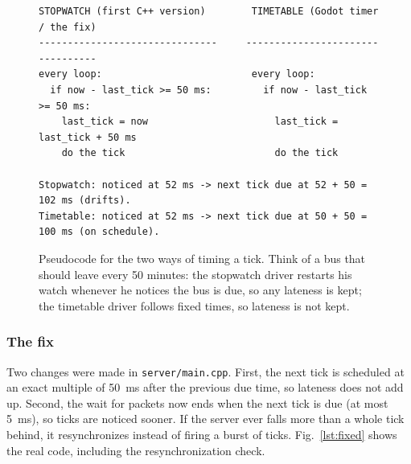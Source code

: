 \IfFileExists{IEEEtran.cls}{\ieeetrue\documentclass[conference]{IEEEtran}}{\ieeefalse\documentclass[twocolumn,10pt]{article}}
\begin{document}
\begin{figure}[!t]
\begin{lstlisting}[language={}]
STOPWATCH (first C++ version)        TIMETABLE (Godot timer / the fix)
-------------------------------     ---------------------------------
every loop:                          every loop:
  if now - last_tick >= 50 ms:         if now - last_tick >= 50 ms:
    last_tick = now                      last_tick = last_tick + 50 ms
    do the tick                          do the tick

Stopwatch: noticed at 52 ms -> next tick due at 52 + 50 = 102 ms (drifts).
Timetable: noticed at 52 ms -> next tick due at 50 + 50 = 100 ms (on schedule).
\end{lstlisting}
\caption{Pseudocode for the two ways of timing a tick. Think of a bus that should leave every 50 minutes: the stopwatch driver restarts his watch whenever he notices the bus is due, so any lateness is kept; the timetable driver follows fixed times, so lateness is not kept.}
\label{lst:pseudo}
\end{figure}

\subsubsection{The fix}\label{sec:thefix}
Two changes were made in \texttt{server/main.cpp}. First, the next tick is scheduled at an exact multiple of 50~ms after the previous due time, so lateness does not add up. Second, the wait for packets now ends when the next tick is due (at most 5~ms), so ticks are noticed sooner. If the server ever falls more than a whole tick behind, it resynchronizes instead of firing a burst of ticks. Fig.~\ref{lst:fixed} shows the real code, including the resynchronization check.
\end{document}
